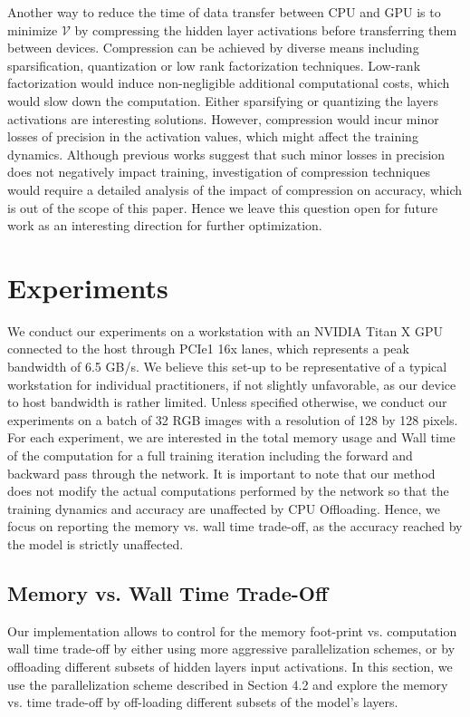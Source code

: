 \documentclass[11pt,onecolumn]{article}
\begin{document}
Another way to reduce the time of data transfer between CPU and GPU is to minimize 
$\mathcal{V}$ by compressing the hidden layer activations 
before transferring them between devices.
Compression can be achieved by diverse means including sparsification, 
quantization or low rank factorization techniques.
Low-rank factorization would induce non-negligible additional computational costs, 
which would slow down the computation.
Either sparsifying or quantizing the layers activations are interesting solutions.
However, compression would incur minor losses of precision in the activation values,
which might affect the training dynamics.
Although previous works suggest that such minor losses in precision does not negatively impact training,
investigation of compression techniques would require a detailed analysis 
of the impact of compression on accuracy, which is out of the scope of this paper.
Hence we leave this question open for future work as an interesting direction for further optimization.

\section{Experiments}

We conduct our experiments on a workstation with an NVIDIA Titan X GPU connected 
to the host through PCIe1 16x lanes, which represents a peak bandwidth of 6.5 GB/s.
We believe this set-up to be representative of a typical workstation for individual practitioners, 
if not slightly unfavorable, as our device to host bandwidth is rather limited.
Unless specified otherwise, we conduct our experiments on a batch of 32 RGB images 
with a resolution of 128 by 128 pixels.
For each experiment, we are interested in the total memory usage and Wall time of
the computation for a full training iteration including the forward and backward pass through the network.
It is important to note that our method does not modify the actual computations performed
by the network so that the training dynamics and accuracy are unaffected by CPU Offloading.
Hence, we focus on reporting the memory vs. wall time trade-off,
 as the accuracy reached by the model is strictly unaffected.

\subsection{Memory vs. Wall Time Trade-Off}

Our implementation allows to control for the memory foot-print vs. computation wall time trade-off by 
either using more aggressive parallelization schemes,
or by offloading different subsets of hidden layers input activations.
In this section, we use the parallelization scheme described in Section 4.2
and explore the memory vs. time trade-off by off-loading different subsets of the model's layers.
\end{document}
